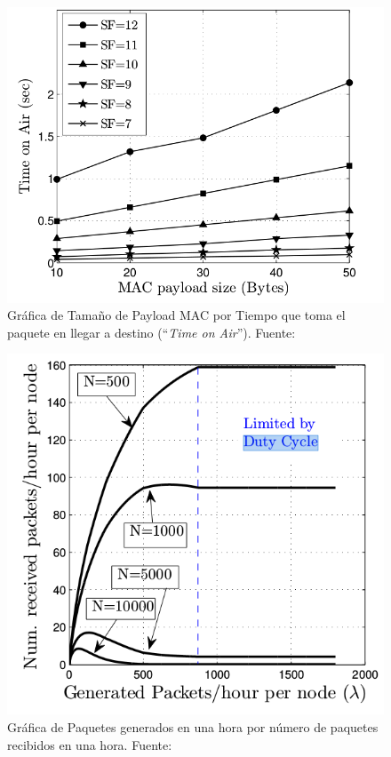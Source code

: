 \begin{justify}
\begin{figure}[!ht]
\centering
\includegraphics[scale=0.4]{images/estadoarte1.png}
\caption{Gráfica de Tamaño de Payload MAC por Tiempo que toma el paquete en llegar a destino (``\textit{Time on Air}''). Fuente:\cite{Xavier}}
\label{arte:1}
\end{figure}
\begin{figure}[!ht]
\centering
\includegraphics[scale=0.4]{images/estadoarte2.png}
\caption{Gráfica de Paquetes generados en una hora por número de paquetes recibidos en una hora. Fuente: \cite{Xavier}}

\end{figure}
\end{justify}
